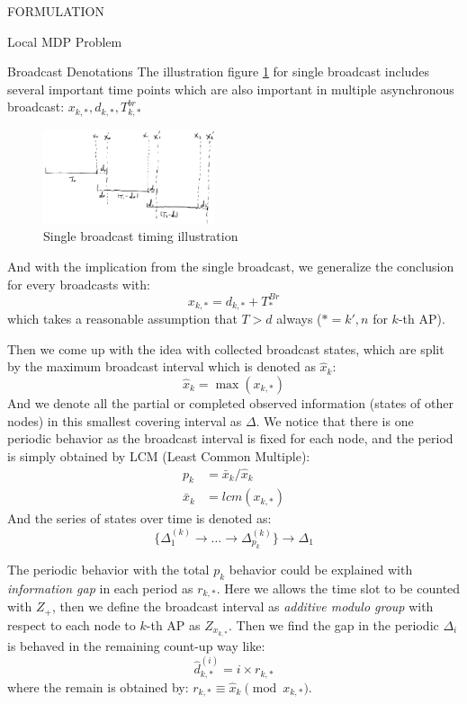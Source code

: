 \documentclass[10pt, conference, letterpaper]{IEEEtran}
\begin{document}
\begin{section}{FORMULATION}
\begin{subsection}{Local MDP Problem}
            \begin{subsubsection}{Broadcast Denotations}
                The illustration figure \ref{fig:brd} for single broadcast includes several important time points which are also important in multiple asynchronous broadcast: $x_{k,*}, d_{k,*}, T^{br}_{k,*}$
                \begin{figure}[h]
                    \centering
                    \includegraphics[width=0.45\textwidth]{single-broadcast.png}
                    \caption{Single broadcast timing illustration}
                    \label{fig:brd}
                \end{figure}
                And with the implication from the single broadcast, we generalize the conclusion for every broadcasts with:
                $$
                x_{k,*} = d_{k,*} + T^{Br}_{*}
                $$
                which takes a reasonable assumption that $T>d$ always ($*=k',n$ for $k$-th AP).

                Then we come up with the idea with collected broadcast states, which are split by the maximum broadcast interval which is denoted as $\hat{x}_k$:
                $$
                \hat{x}_k = \max(x_{k,*})
                $$
                And we denote all the partial or completed observed information (states of other nodes) in this smallest covering interval as $\Delta$.
                We notice that there is one periodic behavior as the broadcast interval is fixed for each node, and the period is simply obtained by LCM (Least Common Multiple):
                \begin{align*}
                    p_{k} &= \bar{x}_k/\hat{x}_k
                    \\
                    \bar{x}_k &= lcm(x_{k,*})
                \end{align*}
                And the series of states over time is denoted as:
                $$
                \{ \Delta^{(k)}_1 \to \dots \to \Delta^{(k)}_{p_k} \} \to \Delta_{1}
                $$
                
                The periodic behavior with the total $p_k$ behavior could be explained with \textit{information gap} in each period as $r_{k,*}$. Here we allows the time slot to be counted with $Z_+$, then we define the broadcast interval as \textit{additive modulo group} with respect to each node to $k$-th AP as $Z_{x_{k,*}}$. Then we find the gap in the periodic $\Delta_i$ is behaved in the remaining count-up way like:
                $$
                \hat{d}_{k,*}^{(i)} = i \times r_{k,*}
                $$
                where the remain is obtained by: $r_{k,*} \equiv \hat{x}_k \pmod{x_{k,*}}$.
            \end{subsubsection}


\end{subsection}
\end{section}
\end{document}
